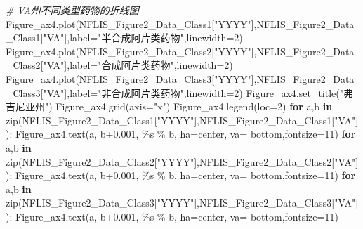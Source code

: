 \documentclass[
]{article}
\newenvironment{Shaded}{}{}
\newcommand{\BuiltInTok}[1]{#1}
\newcommand{\CommentTok}[1]{\textcolor[rgb]{0.38,0.63,0.69}{\textit{#1}}}
\newcommand{\ControlFlowTok}[1]{\textcolor[rgb]{0.00,0.44,0.13}{\textbf{#1}}}
\newcommand{\DecValTok}[1]{\textcolor[rgb]{0.25,0.63,0.44}{#1}}
\newcommand{\FloatTok}[1]{\textcolor[rgb]{0.25,0.63,0.44}{#1}}
\newcommand{\KeywordTok}[1]{\textcolor[rgb]{0.00,0.44,0.13}{\textbf{#1}}}
\newcommand{\NormalTok}[1]{#1}
\newcommand{\OperatorTok}[1]{\textcolor[rgb]{0.40,0.40,0.40}{#1}}
\newcommand{\SpecialCharTok}[1]{\textcolor[rgb]{0.25,0.44,0.63}{#1}}
\newcommand{\StringTok}[1]{\textcolor[rgb]{0.25,0.44,0.63}{#1}}
\begin{document}
\begin{Shaded}
\begin{Highlighting}[]
\CommentTok{\# VA州不同类型药物的折线图}
\NormalTok{Figure\_ax4.plot(NFLIS\_Figure2\_Data\_Class1[}\StringTok{"YYYY"}\NormalTok{],NFLIS\_Figure2\_Data\_Class1[}\StringTok{"VA"}\NormalTok{],label}\OperatorTok{=}\StringTok{"半合成阿片类药物"}\NormalTok{,linewidth}\OperatorTok{=}\DecValTok{2}\NormalTok{)}
\NormalTok{Figure\_ax4.plot(NFLIS\_Figure2\_Data\_Class2[}\StringTok{"YYYY"}\NormalTok{],NFLIS\_Figure2\_Data\_Class2[}\StringTok{"VA"}\NormalTok{],label}\OperatorTok{=}\StringTok{"合成阿片类药物"}\NormalTok{,linewidth}\OperatorTok{=}\DecValTok{2}\NormalTok{)}
\NormalTok{Figure\_ax4.plot(NFLIS\_Figure2\_Data\_Class3[}\StringTok{"YYYY"}\NormalTok{],NFLIS\_Figure2\_Data\_Class3[}\StringTok{"VA"}\NormalTok{],label}\OperatorTok{=}\StringTok{"非合成阿片类药物"}\NormalTok{,linewidth}\OperatorTok{=}\DecValTok{2}\NormalTok{)}
\NormalTok{Figure\_ax4.set\_title(}\StringTok{"弗吉尼亚州"}\NormalTok{)}
\NormalTok{Figure\_ax4.grid(axis}\OperatorTok{=}\StringTok{"x"}\NormalTok{)}
\NormalTok{Figure\_ax4.legend(loc}\OperatorTok{=}\DecValTok{2}\NormalTok{)}
\ControlFlowTok{for}\NormalTok{ a,b }\KeywordTok{in} \BuiltInTok{zip}\NormalTok{(NFLIS\_Figure2\_Data\_Class1[}\StringTok{"YYYY"}\NormalTok{],NFLIS\_Figure2\_Data\_Class1[}\StringTok{"VA"}\NormalTok{]):}
\NormalTok{    Figure\_ax4.text(a, b}\OperatorTok{+}\FloatTok{0.001}\NormalTok{, }\StringTok{\textquotesingle{}}\SpecialCharTok{\%s}\StringTok{\textquotesingle{}} \OperatorTok{\%}\NormalTok{ b, ha}\OperatorTok{=}\StringTok{\textquotesingle{}center\textquotesingle{}}\NormalTok{, va}\OperatorTok{=} \StringTok{\textquotesingle{}bottom\textquotesingle{}}\NormalTok{,fontsize}\OperatorTok{=}\DecValTok{11}\NormalTok{)}
\ControlFlowTok{for}\NormalTok{ a,b }\KeywordTok{in} \BuiltInTok{zip}\NormalTok{(NFLIS\_Figure2\_Data\_Class2[}\StringTok{"YYYY"}\NormalTok{],NFLIS\_Figure2\_Data\_Class2[}\StringTok{"VA"}\NormalTok{]):}
\NormalTok{    Figure\_ax4.text(a, b}\OperatorTok{+}\FloatTok{0.001}\NormalTok{, }\StringTok{\textquotesingle{}}\SpecialCharTok{\%s}\StringTok{\textquotesingle{}} \OperatorTok{\%}\NormalTok{ b, ha}\OperatorTok{=}\StringTok{\textquotesingle{}center\textquotesingle{}}\NormalTok{, va}\OperatorTok{=} \StringTok{\textquotesingle{}bottom\textquotesingle{}}\NormalTok{,fontsize}\OperatorTok{=}\DecValTok{11}\NormalTok{)}
\ControlFlowTok{for}\NormalTok{ a,b }\KeywordTok{in} \BuiltInTok{zip}\NormalTok{(NFLIS\_Figure2\_Data\_Class3[}\StringTok{"YYYY"}\NormalTok{],NFLIS\_Figure2\_Data\_Class3[}\StringTok{"VA"}\NormalTok{]):}
\NormalTok{    Figure\_ax4.text(a, b}\OperatorTok{+}\FloatTok{0.001}\NormalTok{, }\StringTok{\textquotesingle{}}\SpecialCharTok{\%s}\StringTok{\textquotesingle{}} \OperatorTok{\%}\NormalTok{ b, ha}\OperatorTok{=}\StringTok{\textquotesingle{}center\textquotesingle{}}\NormalTok{, va}\OperatorTok{=} \StringTok{\textquotesingle{}bottom\textquotesingle{}}\NormalTok{,fontsize}\OperatorTok{=}\DecValTok{11}\NormalTok{)}
    

\end{Highlighting}
\end{Shaded}
\end{document}
